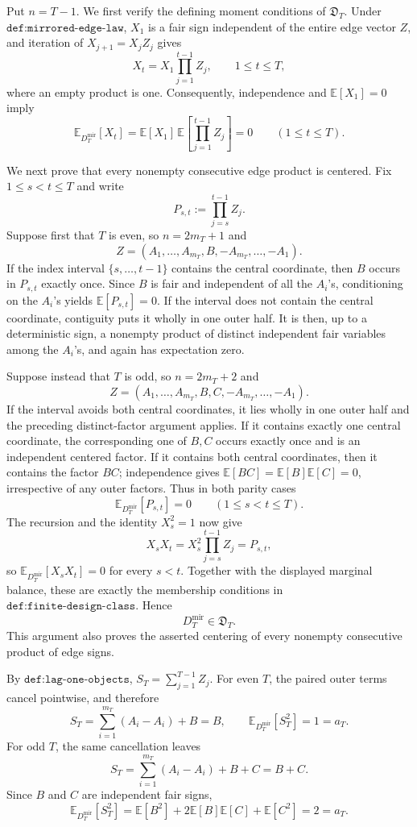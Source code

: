 Put \(n=T-1\).  We first verify the defining moment conditions of \(\mathfrak D_T\).  Under \(\texttt{def:mirrored-edge-law}\), \(X_1\) is a fair sign independent of the entire edge vector \(Z\), and iteration of \(X_{j+1}=X_jZ_j\) gives
\[
 X_t=X_1\prod_{j=1}^{t-1}Z_j,
 \qquad 1\le t\le T,
\]
where an empty product is one.  Consequently, independence and \(\mathbb E[X_1]=0\) imply
\[
 \mathbb E_{D_T^{\mathrm{mir}}}[X_t]
 =\mathbb E[X_1]\,\mathbb E\!\left[\prod_{j=1}^{t-1}Z_j\right]=0
 \qquad(1\le t\le T).
\]

We next prove that every nonempty consecutive edge product is centered.  Fix \(1\le s<t\le T\) and write
\[
 P_{s,t}:=\prod_{j=s}^{t-1}Z_j.
\]
Suppose first that \(T\) is even, so \(n=2m_T+1\) and
\[
 Z=(A_1,\ldots,A_{m_T},B,-A_{m_T},\ldots,-A_1).
\]
If the index interval \(\{s,\ldots,t-1\}\) contains the central coordinate, then \(B\) occurs in \(P_{s,t}\) exactly once.  Since \(B\) is fair and independent of all the \(A_i\)'s, conditioning on the \(A_i\)'s yields \(\mathbb E[P_{s,t}]=0\).  If the interval does not contain the central coordinate, contiguity puts it wholly in one outer half.  It is then, up to a deterministic sign, a nonempty product of distinct independent fair variables among the \(A_i\)'s, and again has expectation zero.

Suppose instead that \(T\) is odd, so \(n=2m_T+2\) and
\[
 Z=(A_1,\ldots,A_{m_T},B,C,-A_{m_T},\ldots,-A_1).
\]
If the interval avoids both central coordinates, it lies wholly in one outer half and the preceding distinct-factor argument applies.  If it contains exactly one central coordinate, the corresponding one of \(B,C\) occurs exactly once and is an independent centered factor.  If it contains both central coordinates, then it contains the factor \(BC\); independence gives \(\mathbb E[BC]=\mathbb E[B]\mathbb E[C]=0\), irrespective of any outer factors.  Thus in both parity cases
\[
 \mathbb E_{D_T^{\mathrm{mir}}}[P_{s,t}]=0
 \qquad(1\le s<t\le T).
\]
The recursion and the identity \(X_s^2=1\) now give
\[
 X_sX_t
 =X_s^2\prod_{j=s}^{t-1}Z_j
 =P_{s,t},
\]
so \(\mathbb E_{D_T^{\mathrm{mir}}}[X_sX_t]=0\) for every \(s<t\).  Together with the displayed marginal balance, these are exactly the membership conditions in \(\texttt{def:finite-design-class}\).  Hence
\[
 D_T^{\mathrm{mir}}\in\mathfrak D_T.
\]
This argument also proves the asserted centering of every nonempty consecutive product of edge signs.

By \(\texttt{def:lag-one-objects}\), \(S_T=\sum_{j=1}^{T-1}Z_j\).  For even \(T\), the paired outer terms cancel pointwise, and therefore
\[
 S_T=\sum_{i=1}^{m_T}(A_i-A_i)+B=B,
 \qquad
 \mathbb E_{D_T^{\mathrm{mir}}}[S_T^2]=1=a_T.
\]
For odd \(T\), the same cancellation leaves
\[
 S_T=\sum_{i=1}^{m_T}(A_i-A_i)+B+C=B+C.
\]
Since \(B\) and \(C\) are independent fair signs,
\[
 \mathbb E_{D_T^{\mathrm{mir}}}[S_T^2]
 =\mathbb E[B^2]+2\mathbb E[B]\mathbb E[C]+\mathbb E[C^2]
 =2=a_T.
\]

